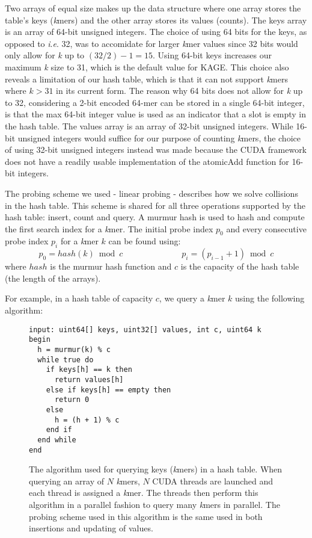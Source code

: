 Two arrays of equal size makes up the data structure where one array stores the table's keys (\textit{k}mers) and the other array stores its values (counts).
The keys array is an array of 64-bit unsigned integers.
The choice of using 64 bits for the keys, as opposed to \textit{i}.\textit{e}. 32, was to accomidate for larger \textit{k}mer values since 32 bits would only allow for \textit{k} up to $(32/2)-1=15$.
Using 64-bit keys increases our maximum \textit{k} size to 31, which is the default value for KAGE.
This choice also reveals a limitation of our hash table, which is that it can not support \textit{k}mers where $k>31$ in its current form.
The reason why 64 bits does not allow for \textit{k} up to 32, considering a 2-bit encoded 64-mer can be stored in a single 64-bit integer, is that the max 64-bit integer value is used as an indicator that a slot is empty in the hash table.
The values array is an array of 32-bit unsigned integers.
While 16-bit unsigned integers would suffice for our purpose of counting \textit{k}mers, the choice of using 32-bit unsigned integers instead was made because the CUDA framework does not have a readily usable implementation of the atomicAdd function for 16-bit integers.

The probing scheme we used - linear probing - describes how we solve collisions in the hash table. 
This scheme is shared for all three operations supported by the hash table: insert, count and query.
A murmur hash \cite{murmur} is used to hash and compute the first search index for a \textit{k}mer.
The initial probe index $p_0$ and every consecutive probe index $p_i$ for a \textit{k}mer $k$ can be found using:
\begin{equation}
  p_0=hash(k) \bmod c \hspace{7em} p_{i}=(p_{i-1}+1) \bmod c
\end{equation}
where $hash$ is the murmur hash function and $c$ is the capacity of the hash table (the length of the arrays).

For example, in a hash table of capacity $c$, we query a \textit{k}mer $k$ using the following algorithm:
\begin{figure}[H]
\begin{lstlisting}[style=pseudocode]
input: uint64[] keys, uint32[] values, int c, uint64 k
begin
  h = murmur(k) % c
  while true do
    if keys[h] == k then
      return values[h]
    else if keys[h] == empty then
      return 0
    else
      h = (h + 1) % c
    end if
  end while
end
\end{lstlisting}
\caption{
  The algorithm used for querying keys (\textit{k}mers) in a hash table. 
  When querying an array of $N$ \textit{k}mers, $N$ CUDA threads are launched and each thread is assigned a \textit{k}mer. 
  The threads then perform this algorithm in a parallel fashion to query many \textit{k}mers in parallel.
  The probing scheme used in this algorithm is the same used in both insertions and updating of values.
}
\end{figure}

